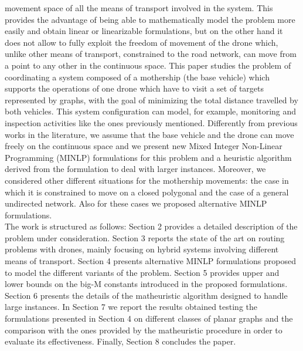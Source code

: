 movement space of all the means of transport involved in the system. This provides the advantage of being able to mathematically model the problem more easily and obtain linear or linearizable formulations, but on the other hand it does not allow to fully exploit the freedom of movement of the drone which, unlike other means of transport, constrained to the road network, can move from a point to any other in the continuous space. This paper studies the problem of coordinating a system composed of a mothership (the base vehicle) which supports the operations of one drone which have to visit a set of targets represented by graphs, with the goal of minimizing the total distance travelled by both vehicles. This system configuration can model, for example, monitoring and inspection activities like the ones previously mentioned. Differently from previous works in the literature, we assume that the base vehicle and the drone can move freely on the continuous space and we present new Mixed Integer Non-Linear Programming (MINLP) formulations for this problem and a heuristic algorithm derived from the formulation to deal with larger instances. Moreover, we considered other different situations for the mothership movements: the case in which it is constrained to move on a closed polygonal and the case of a general undirected network. Also for these cases we proposed alternative MINLP formulations.\\
The work is structured as follows: Section 2 provides a detailed description of the problem under consideration. Section 3 reports the state of the art on routing problems with drones, mainly focusing on hybrid systems involving different means of transport. Section 4 presents alternative MINLP formulations proposed to model the different variants of the problem. Section 5 provides upper and lower bounds on the big-M constants introduced in the proposed formulations. Section 6 presents the details of the matheuristic algorithm designed to handle large instances. In Section 7 we report the results obtained testing the formulations presented in Section 4 on different classes of planar graphs and the comparison with the ones provided by the matheuristic procedure in order to evaluate its effectiveness. Finally, Section 8 concludes the paper.